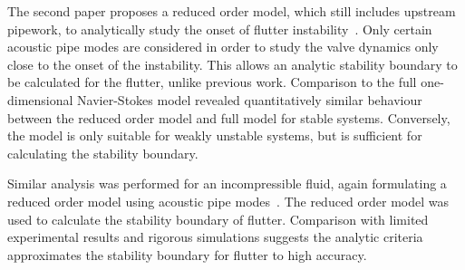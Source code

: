 \newpage
The second paper proposes a reduced order model, which still includes upstream pipework, to analytically study the onset of flutter instability~\cite{Hos2015DynamicModelling}. Only certain acoustic pipe modes are considered in order to study the valve dynamics only close to the onset of the instability. This allows an analytic stability boundary to be calculated for the flutter, unlike previous work.
Comparison to the full one-dimensional Navier-Stokes model revealed quantitatively similar behaviour between the reduced order model and full model for stable systems. Conversely, the model is only suitable for weakly unstable systems, but is sufficient for calculating the stability boundary.

Similar analysis was performed for an incompressible fluid, again formulating a reduced order model using acoustic pipe modes~\cite{Hos2016DynamicService}. The reduced order model was used to calculate the stability boundary of flutter. Comparison with limited experimental results and rigorous simulations suggests the analytic criteria approximates the stability boundary for flutter to high accuracy.

